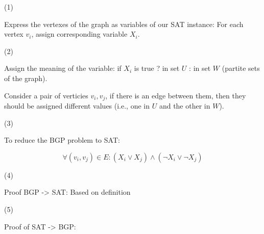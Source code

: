 \documentclass{article}
\begin{document}
(1)

Express the vertexes of the graph as variables of our SAT instance: For each vertex $v_i$, assign corresponding variable $X_i$.

(2)

Assign the meaning of the variable: if $X_i$ is true ? in set $U$ : in set $W$ (partite sets of the graph).

Consider a pair of verticies $v_i, v_j$, if there is an edge between them, then they should be assigned different values (i.e., one in $U$ and the other in $W$).

(3)

To reduce the BGP problem to SAT:

\[\forall (v_i, v_j) \in E: (X_i \lor X_j) \land (\neg X_i \lor \neg X_j)\]

(4)

Proof BGP -> SAT: Based on definition

(5) 

Proof of SAT -> BGP: 
\end{document}
